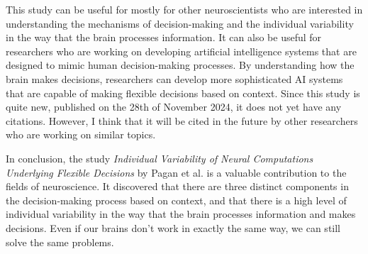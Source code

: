\documentclass{article}
\begin{document}
This study can be useful for mostly for other neuroscientists who are interested in understanding the mechanisms of decision-making and the individual variability in the way that the brain processes information. It can also be useful for researchers who are working on developing artificial intelligence systems that are designed to mimic human decision-making processes. By understanding how the brain makes decisions, researchers can develop more sophisticated AI systems that are capable of making flexible decisions based on context. Since this study is quite new, published on the 28th of November 2024, it does not yet have any citations. However, I think that it will be cited in the future by other researchers who are working on similar topics.

In conclusion, the study \textit{Individual Variability of Neural Computations Underlying Flexible Decisions} by Pagan et al. is a valuable contribution to the fields of neuroscience. It discovered that there are three distinct components in the decision-making process based on context, and that there is a high level of individual variability in the way that the brain processes information and makes decisions. Even if our brains don't work in exactly the same way, we can still solve the same problems.
\end{document}
